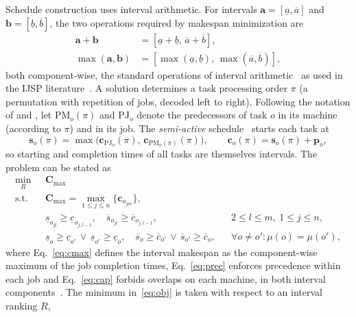 \documentclass[review,authoryear,11pt]{elsarticle}
\begin{document}
Schedule construction uses interval arithmetic. For intervals
$\mathbf{a}=[\underline{a},\overline{a}]$ and
$\mathbf{b}=[\underline{b},\overline{b}]$,
the two operations required by makespan minimization are
\begin{align}
\mathbf{a} + \mathbf{b} &= [\underline{a}+\underline{b},\,
\overline{a}+\overline{b}],\\
\max(\mathbf{a},\mathbf{b}) &= [\max(\underline{a},\underline{b}),\,
\max(\overline{a},\overline{b})],
\end{align}
both component-wise, the standard operations of interval arithmetic~\citep{Moore2009} as used in the IJSP literature~\citep{DiazGA2020}. A solution determines a task
processing order $\pi$ (a permutation with repetition of jobs, decoded
left to right). Following the notation of \citet{DiazGA2020} and
\citet{DiazICAE2023},
let $\mathrm{PM}_o(\pi)$ and $\mathrm{PJ}_o$ denote the predecessors of task $o$ in its
machine (according to $\pi$) and in its job. The \emph{semi-active}
schedule~\citep{Sprecher1995} starts each task at
\begin{equation}
\mathbf{s}_o(\pi) = \max\big(\mathbf{c}_{\mathrm{PJ}_o}(\pi),\,
\mathbf{c}_{\mathrm{PM}_o(\pi)}(\pi)\big), \qquad
\mathbf{c}_o(\pi) = \mathbf{s}_o(\pi) + \mathbf{p}_o,
\end{equation}
so starting and completion times of all tasks are themselves intervals.
The problem can be stated as
\begin{align}
\min_R\; & \mathbf{C}_{\max} \label{eq:obj}\\
\text{s.t.}\quad
& \mathbf{C}_{\max} = \max_{1 \le j \le n} \{\mathbf{c}_{o_{jm}}\},
  \label{eq:cmax}\\
& \underline{s}_{o_{jl}} \ge \underline{c}_{o_{j,l-1}}, \quad
  \overline{s}_{o_{jl}} \ge \overline{c}_{o_{j,l-1}},
  && 2 \le l \le m,\ 1 \le j \le n, \label{eq:prec}\\
& \underline{s}_o \ge \underline{c}_{o'} \,\vee\,
  \underline{s}_{o'} \ge \underline{c}_o, \quad
  \overline{s}_o \ge \overline{c}_{o'} \,\vee\,
  \overline{s}_{o'} \ge \overline{c}_o,
  && \forall o \ne o': \mu(o) = \mu(o'), \label{eq:cap}
\end{align}
where Eq.~\eqref{eq:cmax} defines the interval makespan as the
component-wise maximum of the job completion times,
Eq.~\eqref{eq:prec} enforces precedence within each job and
Eq.~\eqref{eq:cap} forbids overlaps on each machine, in both interval
components~\citep{DiazGA2020,DiazICAE2023}. The minimum
in~\eqref{eq:obj} is taken with respect to an interval ranking $R$,
\end{document}
